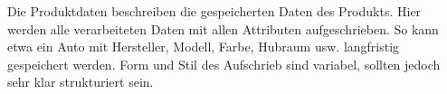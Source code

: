 \begin{tcolorbox}
Die Produktdaten beschreiben die gespeicherten Daten des Produkts. 
Hier werden alle verarbeiteten Daten mit allen Attributen aufgeschrieben.
So kann etwa ein Auto mit Hersteller, Modell, Farbe, Hubraum usw. langfristig gespeichert werden.
Form und Stil des Aufschrieb sind variabel, sollten jedoch sehr klar strukturiert sein.
\end{tcolorbox}